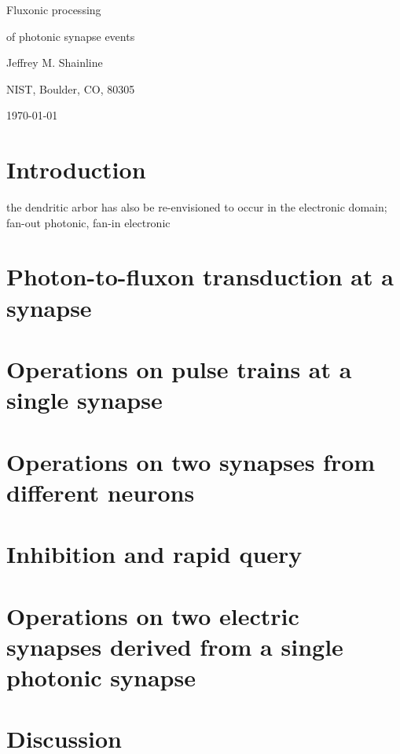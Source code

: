 \documentclass[twocolumn]{article}
\begin{document}
	
	\centerline{\LARGE Fluxonic processing}
	\vspace{0.5em}
	\centerline{\LARGE of photonic synapse events}
	\vspace{0.75em}
	\centerline{\large Jeffrey M. Shainline}
	\vspace{0.5em}
	\centerline{\normalsize NIST, Boulder, CO, 80305}
	\vspace{0.5em}
	\centerline{\small \today}
	
\begin{abstract}

\end{abstract}

\tableofcontents

\section{\label{sec:introduction}Introduction}
	
the dendritic arbor has also be re-envisioned to occur in the electronic domain; fan-out photonic, fan-in electronic	

\section{\label{sec:synapse}Photon-to-fluxon transduction at a synapse}

\section{\label{sec:short_term}Operations on pulse trains at a single synapse}

\section{\label{sec:synapses_from_different_neurons}Operations on two synapses from different neurons}

\section{\label{sec:inhibition_and_rapid_query}Inhibition and rapid query}

\section{\label{sec:synapses_from_the_same_neuron}Operations on two electric synapses derived from a single photonic synapse}

\section{\label{sec:discussion}Discussion}
	
\newpage
\appendix



\end{document}
